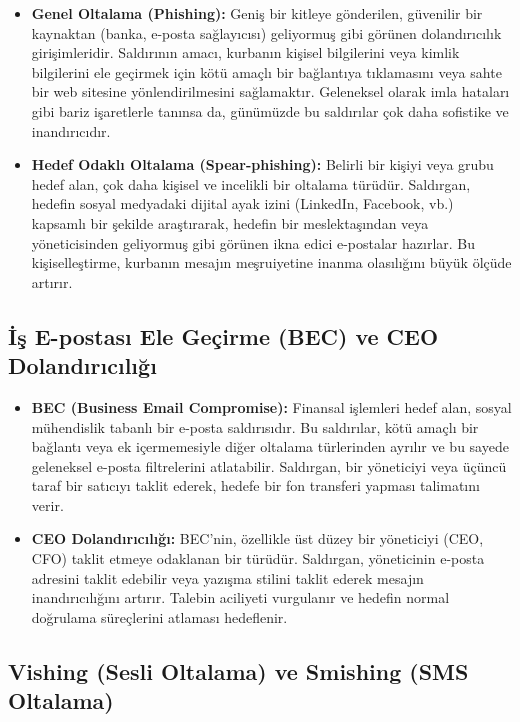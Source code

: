 \begin{itemize}
    \item \textbf{Genel Oltalama (Phishing):} Geniş bir kitleye gönderilen, güvenilir bir kaynaktan (banka, e-posta sağlayıcısı) geliyormuş gibi görünen dolandırıcılık girişimleridir. Saldırının amacı, kurbanın kişisel bilgilerini veya kimlik bilgilerini ele geçirmek için kötü amaçlı bir bağlantıya tıklamasını veya sahte bir web sitesine yönlendirilmesini sağlamaktır. Geleneksel olarak imla hataları gibi bariz işaretlerle tanınsa da, günümüzde bu saldırılar çok daha sofistike ve inandırıcıdır.
    \item \textbf{Hedef Odaklı Oltalama (Spear-phishing):} Belirli bir kişiyi veya grubu hedef alan, çok daha kişisel ve incelikli bir oltalama türüdür. Saldırgan, hedefin sosyal medyadaki dijital ayak izini (LinkedIn, Facebook, vb.) kapsamlı bir şekilde araştırarak, hedefin bir meslektaşından veya yöneticisinden geliyormuş gibi görünen ikna edici e-postalar hazırlar. Bu kişiselleştirme, kurbanın mesajın meşruiyetine inanma olasılığını büyük ölçüde artırır.
\end{itemize}

\subsection{İş E-postası Ele Geçirme (BEC) ve CEO Dolandırıcılığı}

\begin{itemize}
    \item \textbf{BEC (Business Email Compromise):} Finansal işlemleri hedef alan, sosyal mühendislik tabanlı bir e-posta saldırısıdır. Bu saldırılar, kötü amaçlı bir bağlantı veya ek içermemesiyle diğer oltalama türlerinden ayrılır ve bu sayede geleneksel e-posta filtrelerini atlatabilir. Saldırgan, bir yöneticiyi veya üçüncü taraf bir satıcıyı taklit ederek, hedefe bir fon transferi yapması talimatını verir.
    \item \textbf{CEO Dolandırıcılığı:} BEC'nin, özellikle üst düzey bir yöneticiyi (CEO, CFO) taklit etmeye odaklanan bir türüdür. Saldırgan, yöneticinin e-posta adresini taklit edebilir veya yazışma stilini taklit ederek mesajın inandırıcılığını artırır. Talebin aciliyeti vurgulanır ve hedefin normal doğrulama süreçlerini atlaması hedeflenir.
\end{itemize}

\subsection{Vishing (Sesli Oltalama) ve Smishing (SMS Oltalama)}

